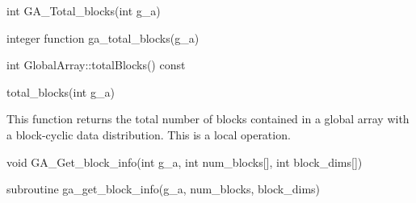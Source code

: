 \documentclass[12pt]{article}
\begin{document}

\begin{capi}
\begin{ccode}
int GA_Total_blocks(int g_a)
\end{ccode}
\begin{funcargs}
\end{funcargs}
\end{capi}

\begin{fapi}
\begin{fcode}
integer function ga_total_blocks(g_a)
\end{fcode}
\begin{funcargs}
\end{funcargs}
\end{fapi}

\begin{cxxapi}
\begin{cxxcode}
int GlobalArray::totalBlocks() const
\end{cxxcode}
\end{cxxapi}

\begin{pyapi}
\begin{pycode}
total_blocks(int g_a)
\end{pycode}
\end{pyapi}

\begin{desc}

This function returns the total number of blocks contained in a global array
with a block-cyclic data distribution. This is a local operation.

\end{desc}


\begin{capi}
\begin{ccode}
void GA_Get_block_info(int g_a, int num_blocks[], int block_dims[])
\end{ccode}
\begin{funcargs}
\end{funcargs}
\end{capi}

\begin{fapi}
\begin{fcode}
subroutine ga_get_block_info(g_a, num_blocks, block_dims)
\end{fcode}
\begin{funcargs}
\end{funcargs}
\end{fapi}
\end{document}
